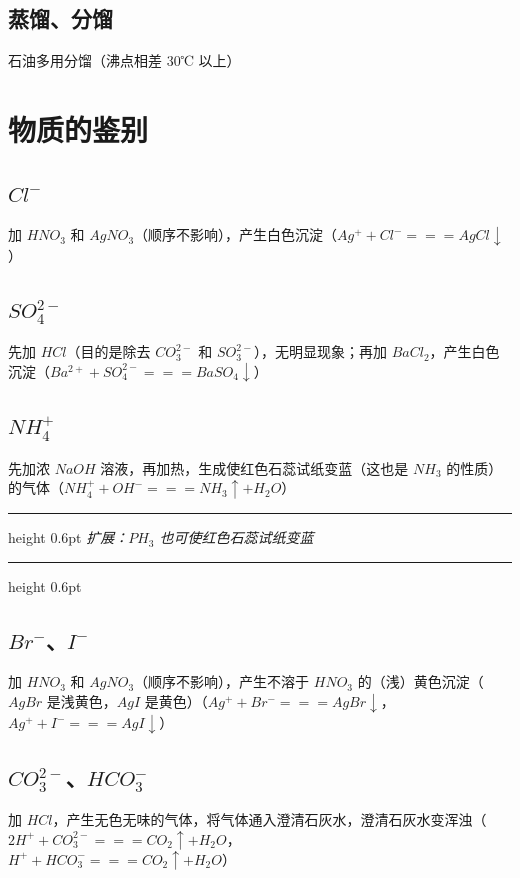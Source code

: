 \documentclass[UTF8,zihao=-4,openany]{ctexbook}
\newenvironment{notebox}
  {\par\smallskip\noindent\begingroup\begin{minipage}{\linewidth}\color{noteframe}\hrule height 0.6pt\smallskip\color{black}\itshape}
  {\par\smallskip\color{noteframe}\hrule height 0.6pt\end{minipage}\endgroup\par\smallskip}
\begin{document}
\subsection{蒸馏、分馏}
石油多用分馏（沸点相差 $30$℃ 以上）\par
\section{物质的鉴别}
\subsection{$Cl^-$}
加 $HNO_3$ 和 $AgNO_3$（顺序不影响），产生白色沉淀（$Ag^++Cl^-=\!=\!=AgCl\downarrow$）\par
\subsection{$SO_4^{2-}$}
先加 $HCl$（目的是除去 $CO_3^{2-}$ 和 $SO_3^{2-}$），无明显现象；再加 $BaCl_2$，产生白色沉淀（$Ba^{2+}+SO_4^{2-}=\!=\!=BaSO_4\downarrow$）\par
\subsection{$NH_4^{+}$}
先加浓 $NaOH$ 溶液，再加热，生成使红色石蕊试纸变蓝（这也是 $NH_3$ 的性质）的气体（$NH_4^++OH^-=\!=\!=NH_3\uparrow+H_2O$）\par
\begin{notebox}
扩展：$PH_3$ 也可使红色石蕊试纸变蓝\par
\end{notebox}
\subsection{$Br^-$、$I^-$}
加 $HNO_3$ 和 $AgNO_3$（顺序不影响），产生不溶于 $HNO_3$ 的（浅）黄色沉淀（$AgBr$ 是浅黄色，$AgI$ 是黄色）（$Ag^++Br^-=\!=\!=AgBr\downarrow$，\\[0.25em]
\hspace*{2em}$Ag^++I^-=\!=\!=AgI\downarrow$）\par
\subsection{$CO_3^{2-}$、$HCO_3^{-}$}
加 $HCl$，产生无色无味的气体，将气体通入澄清石灰水，澄清石灰水变浑浊（$2H^++CO_3^{2-}=\!=\!=CO_2\uparrow+H_2O$，\\[0.25em]
\hspace*{2em}$H^++HCO_3^{-}=\!=\!=CO_2\uparrow+H_2O$）\par
\end{document}
